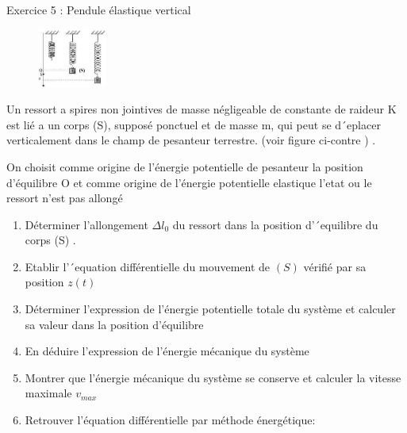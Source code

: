 \documentclass[12pt, french]{article}
\begin{document}
\begin{Box2}{Exercice 5 : Pendule élastique vertical}

  \begin{figure}
  \begin{center}
	  \vspace{-0.6cm}
	\includegraphics[width=0.2\textwidth]{./img/pevàà.png}
  \end{center}
\end{figure}

Un ressort a spires non jointives de masse  négligeable  de constante de raideur K est lié  a un corps (S), supposé
ponctuel et de masse m, qui peut se d´eplacer verticalement dans le champ de pesanteur terrestre. (voir figure
ci-contre ) .

On choisit comme origine de l'énergie potentielle de pesanteur la position d'équilibre O et comme origine de l'énergie potentielle elastique l'etat ou le ressort n'est pas allongé
  \begin{enumerate}
    \item Déterminer l’allongement $\Delta{l_0}$ du ressort dans la position
d’´equilibre du corps (S) .
\item Etablir l’´equation différentielle du mouvement de $(S)$
vérifié par sa position $z(t)$
\item Déterminer l'expression de l'énergie potentielle totale du système et calculer sa valeur dans la position d'équilibre
\item En déduire l'expression de l'énergie mécanique du système
\item Montrer que l’énergie mécanique du système se conserve et
  calculer la vitesse maximale $v_{max}$
\item Retrouver l’équation différentielle par méthode énergétique:
  \end{enumerate}
\end{Box2}


\end{document}
